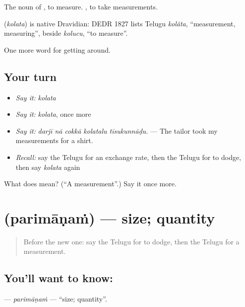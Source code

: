 The noun of , to measure.  , to take measurements.

\begin{cousinweb}
\textbf{} (\emph{kolata}) is native Dravidian: DEDR 1827 lists Telugu \emph{kolãta}, \textquotedblleft{}measurement, measuring\textquotedblright{}, beside \emph{kolucu}, \textquotedblleft{}to measure\textquotedblright{}.
\end{cousinweb}

\begin{grammarlens}[title={What you've built}]
One more word for getting around.
\end{grammarlens}

\subsection*{Your turn}
\begin{itemize}
\raggedright
  \item \emph{Say it:} \emph{kolata}
  \item \emph{Say it:} \emph{kolata}, once more
  \item \emph{Say it:} \emph{darjī nā cokkā kolatalu tīsukunnāḍu.} — The tailor took my measurements for a shirt.
  \item \emph{Recall:} say the Telugu for an exchange rate, then the Telugu for to dodge, then say \emph{kolata} again
\end{itemize}

\begin{tcolorbox}[breakable,colback=teal!4,colframe=teal!35!black,title={Before you move on}]
What does  mean? (\textquotedblleft{}A measurement\textquotedblright{}.) Say it once more.
\end{tcolorbox}
\section[\texorpdfstring{\te{పరిమాణం} (parimāṇaṁ)}{పరిమాణం (parimāṇaṁ)}]{ (parimāṇaṁ) — size; quantity}

\label{lesson:TE-C486-parimanam}



\begin{quote}
Before the new one: say the Telugu for to dodge, then the Telugu for a measurement.
\end{quote}

\subsection*{You'll want to know: }
\textbf{} — \emph{parimāṇaṁ} — \textquotedblleft{}size; quantity\textquotedblright{}.

